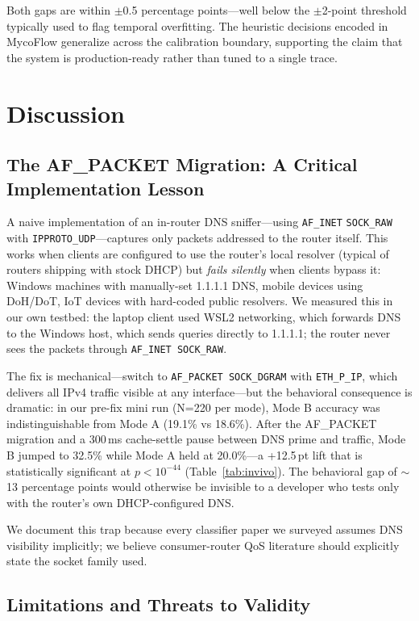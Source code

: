 \documentclass[journal,onecolumn]{IEEEtran}
\begin{document}
Both gaps are within $\pm$0.5 percentage points—well below the
$\pm$2-point threshold typically used to flag temporal overfitting.
The heuristic decisions encoded in MycoFlow generalize across the
calibration boundary, supporting the claim that the system is
production-ready rather than tuned to a single trace.

\section{Discussion}
\label{sec:discussion}

\subsection{The AF\_PACKET Migration: A Critical Implementation Lesson}

A naive implementation of an in-router DNS sniffer—using \texttt{AF\_INET}
\texttt{SOCK\_RAW} with \texttt{IPPROTO\_UDP}—captures only packets
addressed to the router itself. This works when clients are configured to
use the router's local resolver (typical of routers shipping with stock
DHCP) but \emph{fails silently} when clients bypass it: Windows machines
with manually-set 1.1.1.1 DNS, mobile devices using DoH/DoT, IoT devices
with hard-coded public resolvers. We measured this in our own testbed:
the laptop client used WSL2 networking, which forwards DNS to the Windows
host, which sends queries directly to 1.1.1.1; the router never sees the
packets through \texttt{AF\_INET SOCK\_RAW}.

The fix is mechanical—switch to \texttt{AF\_PACKET SOCK\_DGRAM} with
\texttt{ETH\_P\_IP}, which delivers all IPv4 traffic visible at any
interface—but the behavioral consequence is dramatic: in our pre-fix
mini run (N=220 per mode), Mode B accuracy was indistinguishable from
Mode A (19.1\% vs 18.6\%). After the AF\_PACKET migration and a
300\,ms cache-settle pause between DNS prime and traffic, Mode B
jumped to 32.5\% while Mode A held at 20.0\%—a +12.5\,pt lift that is
statistically significant at $p<10^{-44}$ (Table~\ref{tab:invivo}).
The behavioral gap of $\sim$13 percentage points would otherwise be
invisible to a developer who tests only with the router's own
DHCP-configured DNS.

We document this trap because every classifier paper we surveyed assumes
DNS visibility implicitly; we believe consumer-router QoS literature
should explicitly state the socket family used.

\subsection{Limitations and Threats to Validity}
\end{document}
